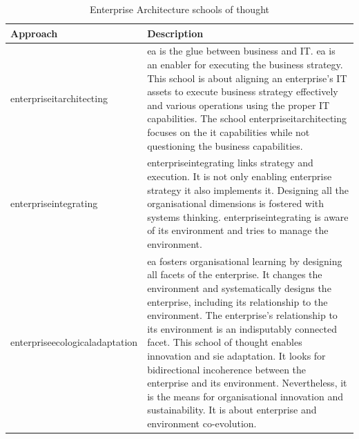 \begin{longtable}{p{}p{}}
	\toprule%
	\textbf{Approach} & \textbf{Description} \\%
	\midrule%
	\endhead%
	\hline
	\endfoot%
	\caption[Enterprise Architecture schools of thought \parencite{Lapalme2012}]{Enterprise Architecture schools of thought \parencite{Lapalme2012}}
	\label{tab:tbschoolsofthought}
	\endlastfoot%
	\gls{enterpriseitarchitecting} & \gls{ea} is the glue between business and IT. \gls{ea} is an enabler for executing the business strategy. This school is about aligning an enterprise's IT assets to execute business strategy effectively and various operations using the proper IT capabilities. The school \gls{enterpriseitarchitecting} focuses on the \acrlong{it} capabilities while not questioning the business capabilities. \\%
	\gls{enterpriseintegrating} & \gls{enterpriseintegrating} links strategy and execution. It is not only enabling enterprise strategy it also implements it. Designing all the organisational dimensions is fostered with systems thinking. \gls{enterpriseintegrating} is aware of its environment and tries to manage the environment. \\%
	\gls{enterpriseecologicaladaptation} & \gls{ea} fosters organisational learning by designing all facets of the enterprise. It changes the environment and systematically designs the enterprise, including its relationship to the environment. The enterprise's relationship to its environment is an indisputably connected facet. This school of thought enables innovation and \gls{sie} adaptation. It looks for bidirectional incoherence between the enterprise and its environment. Nevertheless, it is the means for organisational innovation and sustainability. It is about enterprise and environment co-evolution. \\%
	\bottomrule%
\end{longtable}
